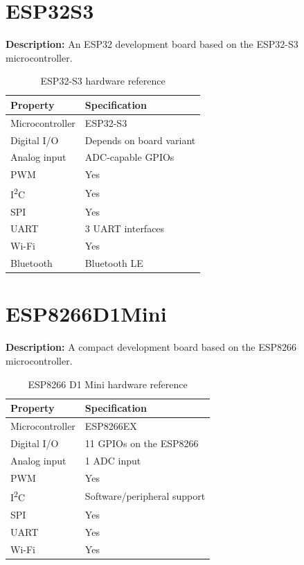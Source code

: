\section{ESP32S3}

\textbf{Description:} An ESP32 development board based on the ESP32-S3
microcontroller.

\begin{table}[H]
\centering
\caption{ESP32-S3 hardware reference}
\label{tab:board-esp32-s3}
\begin{tabular}{ll}
\toprule
\textbf{Property} & \textbf{Specification} \\
\midrule
Microcontroller & ESP32-S3 \\
Digital I/O & Depends on board variant \\
Analog input & ADC-capable GPIOs \\
PWM & Yes \\
I\textsuperscript{2}C & Yes \\
SPI & Yes \\
UART & 3 UART interfaces \\
Wi-Fi & Yes \\
Bluetooth & Bluetooth LE \\
\bottomrule
\end{tabular}
\end{table}

\newpage
\section{ESP8266D1Mini}

\textbf{Description:} A compact development board based on the ESP8266
microcontroller.

\begin{table}[H]
\centering
\caption{ESP8266 D1 Mini hardware reference}
\label{tab:board-esp8266-d1-mini}
\begin{tabular}{ll}
\toprule
\textbf{Property} & \textbf{Specification} \\
\midrule
Microcontroller & ESP8266EX \\
Digital I/O & 11 GPIOs on the ESP8266 \\
Analog input & 1 ADC input \\
PWM & Yes \\
I\textsuperscript{2}C & Software/peripheral support \\
SPI & Yes \\
UART & Yes \\
Wi-Fi & Yes \\
\bottomrule
\end{tabular}
\end{table}

